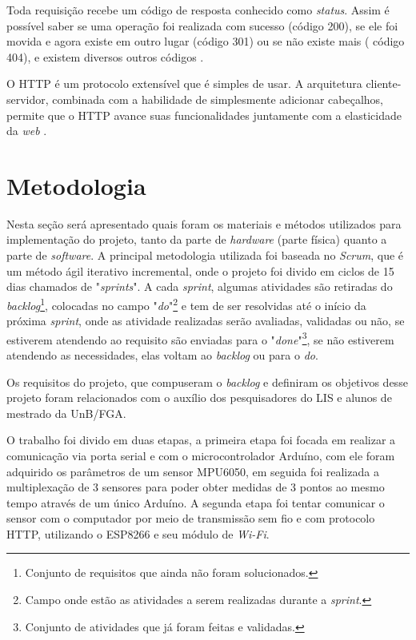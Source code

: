 Toda requisição recebe um código de resposta conhecido como \textit{status}.  Assim é possível saber se uma operação foi realizada com sucesso (código 200), se ele foi movida e agora existe em outro lugar (código 301) ou se não existe mais ( código 404), e existem diversos outros códigos \cite{vieira2007}.

O HTTP é um protocolo extensível que é simples de usar. A arquitetura cliente-servidor, combinada com a habilidade de simplesmente adicionar cabeçalhos, permite que o HTTP avance suas funcionalidades juntamente com a elasticidade da \textit{web} \cite{szigalski2018}.



\chapter[Metodologia]{Metodologia}

Nesta seção será apresentado quais foram os materiais e métodos utilizados para implementação do projeto, tanto da parte de \textit{hardware} (parte física) quanto a parte de \textit{software}. A principal metodologia utilizada foi baseada  no \textit{Scrum}, que é um método ágil iterativo incremental, onde o projeto foi divido em ciclos de 15 dias chamados de "\textit{sprints}". A cada \textit{sprint}, algumas atividades são retiradas do \textit{backlog}\footnote{Conjunto de requisitos que ainda não foram solucionados.}, colocadas no campo "\textit{do}"\footnote{Campo onde estão as atividades a serem realizadas durante a \textit{sprint}.}  e tem de ser resolvidas até o início da próxima \textit{sprint}, onde as atividade realizadas serão avaliadas,  validadas ou não, se estiverem atendendo ao requisito são enviadas para o "\textit{done}"\footnote{Conjunto de atividades que já foram feitas e validadas.}, se não estiverem atendendo as necessidades, elas voltam ao \textit{backlog} ou para o \textit{do}.

Os requisitos do projeto, que compuseram o \textit{backlog} e definiram os objetivos desse projeto foram relacionados com o auxílio dos pesquisadores do LIS e alunos de mestrado da UnB/FGA.

O trabalho foi divido em duas etapas, a primeira etapa foi focada em realizar a comunicação via porta serial  e com o microcontrolador Arduíno, com ele foram adquirido os parâmetros de um sensor MPU6050, em seguida foi realizada a multiplexação de 3 sensores para poder obter medidas de 3 pontos ao mesmo tempo através de um único Arduíno. A segunda etapa foi tentar comunicar o sensor com o computador por meio de transmissão sem fio e com protocolo HTTP, utilizando o ESP8266 e seu módulo de \textit{Wi-Fi}.
   
